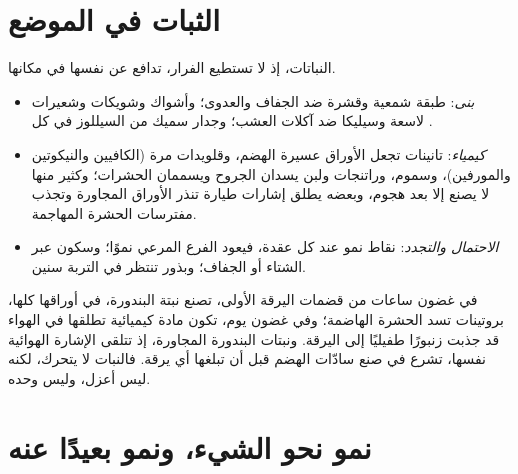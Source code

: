 \section{الثبات في الموضع}

\begin{proposition}\label{prop:g12:plant-rooted-life:defences}
النباتات، إذ لا تستطيع الفرار، تدافع عن نفسها في مكانها.
\begin{itemize}
  \item \emph{بنى}: طبقة شمعية وقشرة ضد الجفاف والعدوى؛ وأشواك وشويكات
        وشعيرات لاسعة وسيليكا ضد آكلات العشب؛ وجدار سميك من السيللوز
        في كل .
  \item \emph{كيمياء}: تانينات تجعل الأوراق عسيرة الهضم، وقلويدات مرة
        (الكافيين والنيكوتين والمورفين)، وسموم، وراتنجات ولبن يسدان
        الجروح ويسممان الحشرات؛ وكثير منها لا يصنع إلا بعد هجوم، وبعضه
        يطلق إشارات طيارة تنذر الأوراق المجاورة وتجذب مفترسات الحشرة
        المهاجمة.
  \item \emph{الاحتمال والتجدد}: نقاط نمو عند كل عقدة، فيعود الفرع
        المرعي نموًا؛ وسكون عبر الشتاء أو الجفاف؛ وبذور تنتظر في
        التربة سنين.
\end{itemize}
\end{proposition}
\admitted

\begin{example}\label{ex:g12:plant-rooted-life:caterpillar}
في غضون ساعات من قضمات اليرقة الأولى، تصنع نبتة البندورة، في أوراقها
كلها، بروتينات تسد  الحشرة الهاضمة؛ وفي غضون يوم، تكون مادة
كيميائية تطلقها في الهواء قد جذبت زنبورًا طفيليًا إلى اليرقة. ونبتات
البندورة المجاورة، إذ تتلقى الإشارة الهوائية نفسها، تشرع في صنع
سادّات الهضم قبل أن تبلغها أي يرقة. فالنبات لا يتحرك، لكنه ليس أعزل،
وليس وحده.
\end{example}

\section{نمو نحو الشيء، ونمو بعيدًا عنه}

